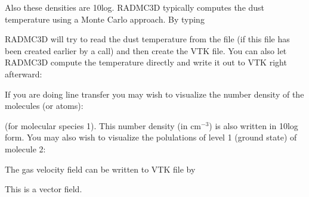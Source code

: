 \documentclass[letterpaper,10pt,english]{sphinxmanual}
\begin{document}
Also these densities are 10\sphinxhyphen{}log. RADMC\sphinxhyphen{}3D typically computes the dust
temperature using a Monte Carlo approach. By typing

\begin{sphinxVerbatim}[commandchars=\\\{\}]
  
\end{sphinxVerbatim}

RADMC\sphinxhyphen{}3D will try to read the dust temperature from the file
 (if this file has been created
earlier by a  call) and then create
the VTK file. You can also let RADMC\sphinxhyphen{}3D compute the temperature
directly and write it out to VTK right afterward:

\begin{sphinxVerbatim}[commandchars=\\\{\}]
   
\end{sphinxVerbatim}

If you are doing line transfer you may wish to visualize the number density
of the molecules (or atoms):

\begin{sphinxVerbatim}[commandchars=\\\{\}]
  
\end{sphinxVerbatim}

(for molecular species 1). This number density (in cm\(^{-3}\)) is also
written in 10\sphinxhyphen{}log form.  You may also wish to visualize the polulations of
level 1 (ground state) of molecule 2:

\begin{sphinxVerbatim}[commandchars=\\\{\}]
   
\end{sphinxVerbatim}

The gas velocity field can be written to VTK file by

\begin{sphinxVerbatim}[commandchars=\\\{\}]
 
\end{sphinxVerbatim}

This is a vector field.
\end{document}
